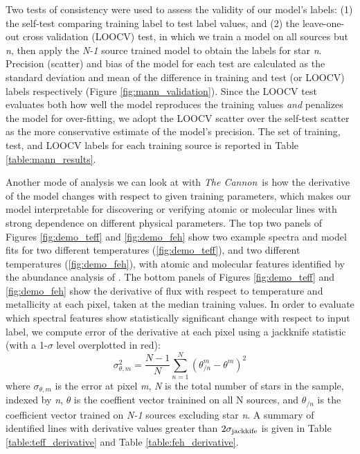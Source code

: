 \documentclass[modern]{aastex62}
\newcommand{\thecannon}{\textsl{The Cannon}}
\begin{document}
Two tests of consistency were used to assess the validity of our model's labels: (1) the self-test comparing training label to test label values, and (2) the leave-one-out cross validation (LOOCV) test, in which we train a model on all sources but \emph{n}, then apply the \emph{N-1} source trained model to obtain the labels for star \emph{n}. Precision (scatter) and bias of the model for each test are calculated as the standard deviation and mean of the difference in training and test (or LOOCV) labels respectively (Figure \ref{fig:mann_validation}). Since the LOOCV test evaluates both how well the model reproduces the training values \emph{and} penalizes the model for over-fitting, we adopt the LOOCV scatter over the self-test scatter as the more conservative estimate of the model's precision. The set of training, test, and LOOCV labels for each training source is reported in Table \ref{table:mann_results}.

Another mode of analysis we can look at with \thecannon\ is how the derivative of the model changes with respect to given training parameters, which makes our model interpretable for discovering or verifying atomic or molecular lines with strong dependence on different physical parameters. The top two panels of Figures \ref{fig:demo_teff} and \ref{fig:demo_feh} show two example spectra and model fits for two different temperatures (\ref{fig:demo_teff}), and two different temperatures (\ref{fig:demo_feh}), with atomic and molecular features identified by the abundance analysis of \citealt{Souto:2017}. The bottom panels of Figures \ref{fig:demo_teff} and \ref{fig:demo_feh} show the derivative of flux with respect to temperature and metallicity at each pixel, taken at the median training values. In order to evaluate which spectral features show statistically significant change with respect to input label, we compute error of the derivative at each pixel using a jackknife statistic (with a 1-$\sigma$ level overplotted in red):
\begin{equation}
	\sigma_{\theta,m}^2 = \frac{N-1}{N} \sum^N_{n=1} (\theta_{/n}^m - \theta^m)^2 
\end{equation}
where $\sigma_{\theta,m}$ is the error at pixel \emph{m}, \emph{N} is the total number of stars in the sample, indexed by \emph{n}, $\theta$ is the coeffient vector trainined on all N sources, and $\theta_{/n}$ is the coefficient vector trained on \emph{N-1} sources excluding star \emph{n}. A summary of identified lines with derivative values greater than $2\sigma_{\rm jackkife}$ is given in Table \ref{table:teff_derivative} and Table \ref{table:feh_derivative}.
\end{document}
